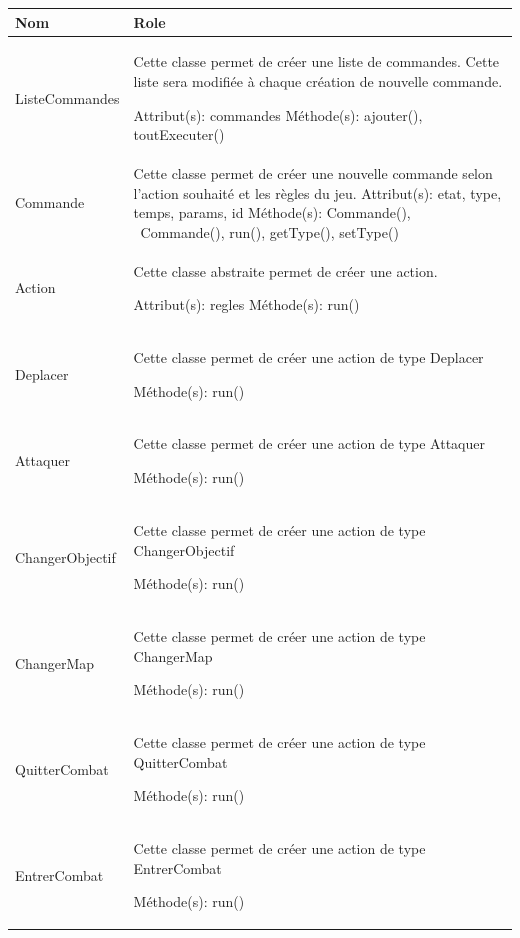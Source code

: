 \documentclass[11pt, a4paper]{article}
\begin{document}
\begin{tabularx}{\textwidth}{ |l|X| }
\hline
   \textbf{Nom} & \textbf{Role}
 \\
\hline

   ListeCommandes & Cette classe permet de créer une liste de commandes. Cette liste sera modifiée à chaque création de nouvelle commande.

Attribut(s): commandes
\newline
Méthode(s): ajouter(), toutExecuter()
 \\
\hline

   Commande & Cette classe permet de créer une nouvelle commande selon l'action souhaité et les règles du jeu.
Attribut(s): etat, type, temps, params, id
\newline
Méthode(s): Commande(), ~Commande(), run(), getType(), setType()
 \\
\hline

    Action & Cette classe abstraite permet de créer une action.
    
Attribut(s): regles
\newline
Méthode(s): run()
  \\
\hline

    Deplacer & Cette classe permet de créer une action de type Deplacer

Méthode(s): run()
  \\
\hline

 Attaquer & Cette classe permet de créer une action de type Attaquer
 
Méthode(s): run()
  \\
\hline

 ChangerObjectif & Cette classe permet de créer une action de type ChangerObjectif
 
Méthode(s): run()
  \\
\hline

 ChangerMap & Cette classe permet de créer une action de type ChangerMap
 
Méthode(s): run()
  \\
\hline

 QuitterCombat & Cette classe permet de créer une action de type QuitterCombat
 
Méthode(s): run()
  \\
\hline

 EntrerCombat & Cette classe permet de créer une action de type EntrerCombat
 
Méthode(s): run()
  \\
\hline


\end{tabularx}
\end{document}

